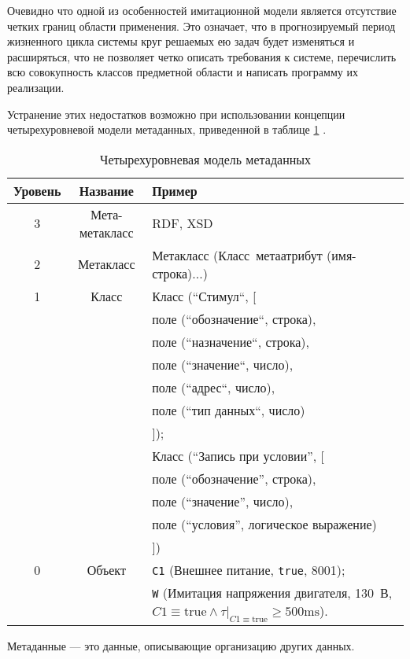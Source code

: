 Очевидно что одной из особенностей имитационной модели является отсутствие четких границ области применения.
Это означает, что в прогнозируемый период жизненного цикла системы круг решаемых ею задач будет изменяться и расширяться,
что не позволяет четко описать требования к системе, перечислить всю совокупность классов предметной области и
написать программу их реализации.

Устранение этих недостатков возможно при использовании концепции четырехуровневой модели метаданных, приведенной
в таблице \ref{tbl:meta_data_levels} \cite{journal:vestnik_spbgu:ivakin,book:gost:56272,w3c:rdf:lassila}.
\begin{table}[ht!]
    \begin{center}
    \caption{Четырехуровневая модель метаданных}\label{tbl:meta_data_levels}
    \begin{tabular}{|c|c|p{}|}
    \hline
    \textbf{Уровень} & \textbf{Название} & \textbf{Пример} \\\hline
    3 & Мета-метакласс & RDF, XSD \\\hline
    2 & Метакласс & Метакласс (Класс~метаатрибут (имя-строка)...) \\\hline
    1 & Класс & Класс (``Стимул``, [\\
                &&\hspace{5mm}поле (``обозначение``, строка), \\
                &&\hspace{5mm}поле (``назначение``, строка), \\
                &&\hspace{5mm}поле (``значение``, число),\\
                &&\hspace{5mm}поле (``адрес``, число),\\
                &&\hspace{5mm}поле (``тип данных``, число)\\
            &&]);\\
            &&Класс (``Запись при условии'', [\\
                &&\hspace{5mm}поле (``обозначение'', строка),\\
                &&\hspace{5mm}поле (``значение'', число),\\
                &&\hspace{5mm}поле (``условия'', логическое выражение)\\
            &&])\\\hline
    0 & Объект & 
        \texttt{C1} (Внешнее питание, \texttt{true}, 8001); \\
        &&\texttt{W} (Имитация напряжения двигателя, 130~В, $C1 \equiv \mbox{true} \wedge \tau|_{C1\equiv\mbox{true}} \ge 500\mbox{ms}$).
        \\\hline
\end{tabular}
\end{center}
\end{table}
Метаданные --- это данные, описывающие организацию других данных.

